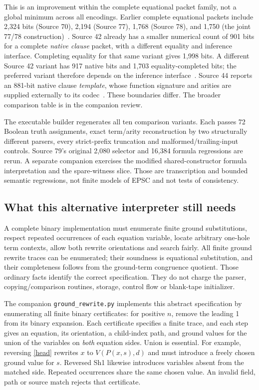 This is an improvement within the complete equational packet family, not a
global minimum across all encodings. Earlier complete equational packets
include 2,324 bits (Source 70), 2,194 (Source 77), 1,768 (Source 78), and
1,750 (the joint 77/78 construction)~\cite{earlier}. Source 42 already has
a smaller numerical count of 901 bits for a complete \emph{native clause}
packet, with a different equality and inference interface. Completing
equality for that same variant gives 1,998 bits. A different Source 42
variant has 917 native bits and 1,703 equality-completed bits; the preferred
variant therefore depends on the inference interface~\cite{clause42}.
Source 44 reports
an 881-bit native clause \emph{template}, whose function signature and
arities are supplied externally to its codec~\cite{template44}. These
boundaries differ. The broader comparison table is in the companion review.

The executable builder regenerates all ten comparison variants. Each
passes 72 Boolean truth assignments, exact term/arity reconstruction by
two structurally different parsers, every strict-prefix truncation and
malformed/trailing-input controls. Source 79's original 2,080 selector and
16,384 formula regressions are rerun. A separate companion exercises the
modified shared-constructor formula interpretation and the spare-witness
slice. Those are transcription and bounded semantic regressions, not
finite models of EPSC and not tests of consistency.

\subsection{What this alternative interpreter still needs}

A complete binary implementation must enumerate finite ground substitutions,
respect repeated occurrences of each equation variable, locate arbitrary
one-hole term contexts, allow both rewrite orientations and search fairly.
All finite ground rewrite traces can be enumerated; their soundness is
equational substitution, and their completeness follows from the ground-term
congruence quotient. Those ordinary facts identify the correct specification.
They do not charge the parser, copying/comparison routines, storage, control
flow or blank-tape initializer.

The companion \texttt{ground\_rewrite.py} implements this abstract
specification by enumerating all finite binary certificates: for positive
$n$, remove the leading 1 from its binary expansion. Each certificate
specifies a finite trace, and each step gives an equation, its orientation,
a child-index path, and ground values for the union of the variables on
\emph{both} equation sides. Union is essential. For example, reversing
\eqref{head} rewrites $x$ to $V(P(x,s),d)$ and must introduce a freely
chosen ground value for $s$. Reversed Sh1 likewise introduces variables
absent from the matched side. Repeated occurrences share the same chosen
value. An invalid field, path or source match rejects that certificate.

